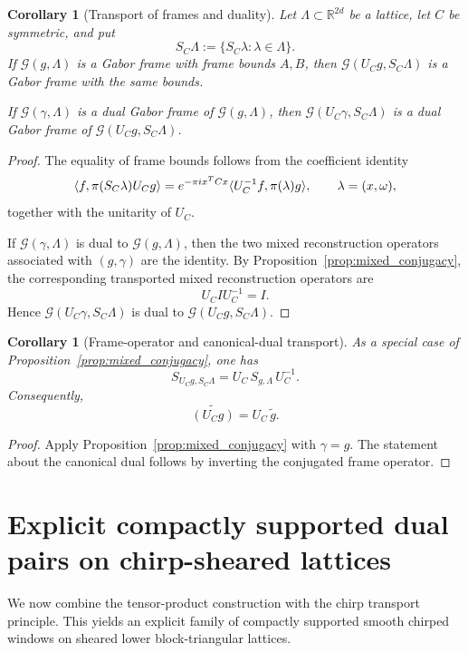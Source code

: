 \documentclass[final,1p,times,authoryear]{elsarticle}
\newtheorem{corollary}[theorem]{Corollary}
\theoremstyle{definition}
\newcommand{\R}{\mathbb{R}}
\newcommand{\1}{\mathbf{1}}
\DeclarePairedDelimiter{\inner}{\langle}{\rangle}
\begin{document}
\begin{corollary}[Transport of frames and duality]\label{cor:transport_duality}
Let $\Lambda\subset \R^{2d}$ be a lattice, let $C$ be symmetric, and put
$$
S_C\Lambda:=\{S_C\lambda:\lambda\in\Lambda\}.
$$
If $\mathcal G(g,\Lambda)$ is a Gabor frame with frame bounds $A,B$, then
$\mathcal G(U_C g,S_C\Lambda)$ is a Gabor frame with the same bounds.

If $\mathcal G(\gamma,\Lambda)$ is a dual Gabor frame of $\mathcal G(g,\Lambda)$, then
$\mathcal G(U_C\gamma,S_C\Lambda)$ is a dual Gabor frame of $\mathcal G(U_C g,S_C\Lambda)$.
\end{corollary}
\begin{proof}
{The equality of frame bounds follows from the coefficient identity
$$
\inner{f,\pi(S_C\lambda)U_Cg}
=
e^{-\pi i x^TCx}\inner{U_C^{-1}f,\pi(\lambda)g},
\qquad \lambda=(x,\omega),
$$
together with the unitarity of $U_C$.}

{If $\mathcal G(\gamma,\Lambda)$ is dual to $\mathcal G(g,\Lambda)$, then the two mixed
reconstruction operators associated with $(g,\gamma)$ are the identity. By
Proposition~\ref{prop:mixed_conjugacy}, the corresponding transported mixed reconstruction
operators are
$$
U_C I U_C^{-1}=I.
$$
Hence $\mathcal G(U_C\gamma,S_C\Lambda)$ is dual to
$\mathcal G(U_Cg,S_C\Lambda)$.}
\end{proof}

{\begin{corollary}[Frame-operator and canonical-dual transport]\label{cor:frame_operator_conjugacy}
As a special case of Proposition~\ref{prop:mixed_conjugacy}, one has
$$
S_{U_C g,S_C\Lambda}
=
U_C\,S_{g,\Lambda}\,U_C^{-1}.
$$
Consequently,
$$
\widetilde{(U_C g)}
=
U_C\,\widetilde g.
$$
\end{corollary}}
{\begin{proof}
Apply Proposition~\ref{prop:mixed_conjugacy} with $\gamma=g$. The statement about the
canonical dual follows by inverting the conjugated frame operator.
\end{proof}}

\section{Explicit compactly supported dual pairs on chirp-sheared lattices}

{We now combine the tensor-product construction with the chirp transport principle.
This yields an explicit family of compactly supported smooth chirped windows on sheared
lower block-triangular lattices.}
\end{document}

